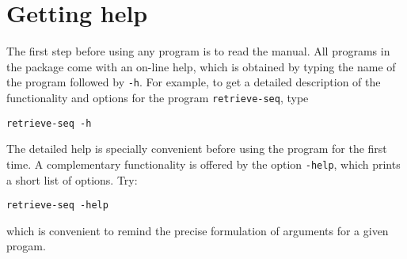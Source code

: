 \section{Getting help} 

The first step before using any program is to read the manual. All
programs in the \RSAT package come with an on-line help, which
is obtained by typing the name of the program followed by
\texttt{-h}. For example, to get a detailed description of the
functionality and options for the program \texttt{retrieve-seq}, type

\begin{verbatim}
retrieve-seq -h
\end{verbatim}

The detailed help is specially convenient before using the program for
the first time. A complementary functionality is offered by the option
\texttt{-help}, which prints a short list of options. Try:

\begin{verbatim}
retrieve-seq -help
\end{verbatim}

which is convenient to remind the precise formulation of arguments for
a given progam.


